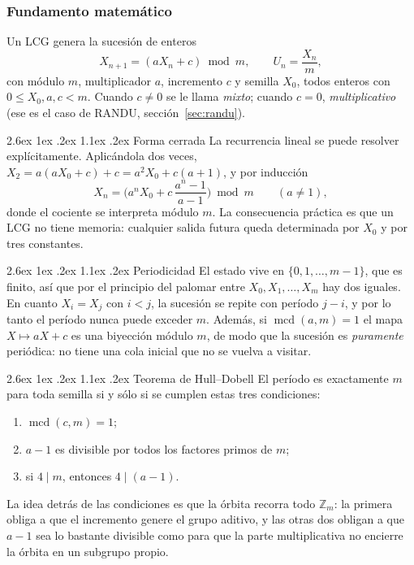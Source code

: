 \documentclass[11pt,letterpaper]{article}
\makeatletter
\renewcommand\paragraph{\@startsection{paragraph}{4}{\z@}%
  {2.6ex \@plus 1ex \@minus .2ex}%
  {1.1ex \@plus .2ex}%
  {\normalfont\normalsize\bfseries}}
\DeclareMathOperator{\mcd}{mcd}
\makeatother
\begin{document}
\subsubsection{Fundamento matemático}

Un LCG genera la sucesión de enteros
\begin{equation}
X_{n+1} = (a X_n + c) \bmod m,
\qquad U_n = \frac{X_n}{m},
\label{eq:lcg}
\end{equation}
con módulo $m$, multiplicador $a$, incremento $c$ y semilla $X_0$, todos
enteros con $0 \le X_0, a, c < m$. Cuando $c \neq 0$ se le llama
\emph{mixto}; cuando $c = 0$, \emph{multiplicativo} (ese es el caso de RANDU,
sección~\ref{sec:randu}).

\paragraph{Forma cerrada} La recurrencia lineal se puede resolver
explícitamente. Aplicándola dos veces,
$X_2 = a(aX_0+c)+c = a^2X_0 + c(a+1)$, y por inducción
\begin{equation}
X_n = \Big(a^n X_0 + c\,\frac{a^n - 1}{a - 1}\Big) \bmod m
\qquad (a \neq 1),
\label{eq:lcgcerrada}
\end{equation}
donde el cociente se interpreta módulo $m$. La consecuencia práctica es que
un LCG no tiene memoria: cualquier salida futura queda determinada por
$X_0$ y por tres constantes.

\paragraph{Periodicidad} El estado vive en $\{0,1,\dots,m-1\}$, que es
finito, así que por el principio del palomar entre $X_0, X_1, \dots, X_m$ hay
dos iguales. En cuanto $X_i = X_j$ con $i<j$, la sucesión se repite con
período $j-i$, y por lo tanto el período nunca puede exceder $m$. Además, si
$\mcd(a,m)=1$ el mapa $X \mapsto aX+c$ es una biyección módulo $m$, de modo
que la sucesión es \emph{puramente} periódica: no tiene una cola inicial que
no se vuelva a visitar.

\paragraph{Teorema de Hull--Dobell} El período es exactamente $m$ para toda
semilla si y sólo si se cumplen estas tres condiciones:
\begin{enumerate}[label=(\roman*), itemsep=1pt]
  \item $\mcd(c, m) = 1$;
  \item $a - 1$ es divisible por todos los factores primos de $m$;
  \item si $4 \mid m$, entonces $4 \mid (a-1)$.
\end{enumerate}
La idea detrás de las condiciones es que la órbita recorra todo
$\mathbb{Z}_m$: la primera obliga a que el incremento genere el grupo
aditivo, y las otras dos obligan a que $a-1$ sea lo bastante divisible como
para que la parte multiplicativa no encierre la órbita en un subgrupo propio.
\end{document}

